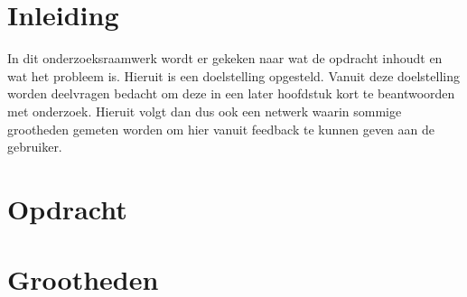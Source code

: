 \documentclass[12pt, a4paper, twoside]{article}
\numberwithin{equation}{section}
\begin{document}
    \makeTitlepage
    \onecolumn
    \tableofcontents
    \newpage

    \section{Inleiding}
    In dit onderzoeksraamwerk wordt er gekeken naar wat de opdracht inhoudt en wat het probleem is. 
    Hieruit is een doelstelling opgesteld. Vanuit deze doelstelling worden deelvragen bedacht om deze in een 
    later hoofdstuk kort te beantwoorden met onderzoek. Hieruit volgt dan dus ook een netwerk waarin sommige 
    grootheden gemeten worden om hier vanuit feedback te kunnen geven aan de gebruiker. 

    \section{Opdracht}
    

    \newpage
    \section{Grootheden}
    

    \newpage    
    \printbibliography

    \appendix
\end{document}
